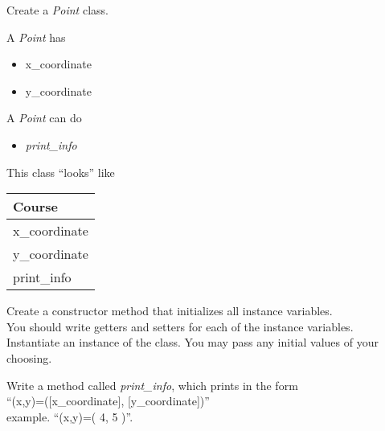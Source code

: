 
	\item Create a \textit{Point} class.\\
	\begin{minipage}{.6\textwidth}		
		A \textit{Point} has
		\begin{itemize}
			\item x\_coordinate 
			\item y\_coordinate 
		\end{itemize}

		A \textit{Point} can do
		\begin{itemize}
			\item \textit{print\_info}
		\end{itemize}
	\end{minipage}
	\begin{minipage}{.4\textwidth}
		This class ``looks'' like 
				
		\vspace*{1em}
		\begin{tabular}{|l|}
			\hline Course\\ \hline
			x\_coordinate\\ y\_coordinate\\ \hline
			print\_info\\  \hline
		\end{tabular}
	\end{minipage}

	\vspace*{2ex}
	Create a constructor method that initializes all instance variables.\\
	You should write getters and setters for each of the instance variables.\\
	Instantiate an instance of the class. You may pass any initial values of your choosing.

	Write a method called \textit{print\_info}, which prints in the form \\
		\tab \tab \tab ``(x,y)=([x\_coordinate], [y\_coordinate])''\\
	example. ``(x,y)=( 4, 5 )''.\\






